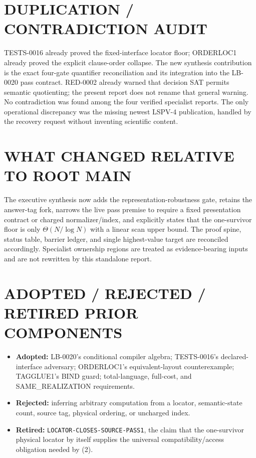 \documentclass[11pt]{article}
\begin{document}
\section{DUPLICATION / CONTRADICTION AUDIT}

TESTS-0016 already proved the fixed-interface locator floor; ORDERLOC1 already
proved the explicit clause-order collapse.  The new synthesis contribution is
the exact four-gate quantifier reconciliation and its integration into the
LB-0020 pass contract.  RED-0002 already warned that decision SAT permits
semantic quotienting; the present report does not rename that general warning.
No contradiction was found among the four verified specialist reports.  The
only operational discrepancy was the missing newest LSPV-4 publication,
handled by the recovery request without inventing scientific content.

\section{WHAT CHANGED RELATIVE TO ROOT MAIN}

The executive synthesis now adds the representation-robustness gate, retains
the answer-tag fork, narrows the live pass premise to require a fixed
presentation contract or charged normalizer/index, and explicitly states that
the one-survivor floor is only $\Theta(N/\log N)$ with a linear scan upper
bound.  The proof spine, status table, barrier ledger, and single highest-value
target are reconciled accordingly.  Specialist ownership regions are treated
as evidence-bearing inputs and are not rewritten by this standalone report.

\section{ADOPTED / REJECTED / RETIRED PRIOR COMPONENTS}

\begin{itemize}[leftmargin=1.6em]
\item \textbf{Adopted:} LB-0020's conditional compiler algebra;
TESTS-0016's declared-interface adversary; ORDERLOC1's equivalent-layout
counterexample; TAGGLUE1's BIND guard; total-language, full-cost, and
SAME\_REALIZATION requirements.
\item \textbf{Rejected:} inferring arbitrary computation from a locator,
semantic-state count, source tag, physical ordering, or uncharged index.
\item \textbf{Retired:} \texttt{LOCATOR-CLOSES-SOURCE-PASS1}, the claim that
the one-survivor physical locator by itself supplies the universal
compatibility/access obligation needed by (2).
\end{itemize}
\end{document}
